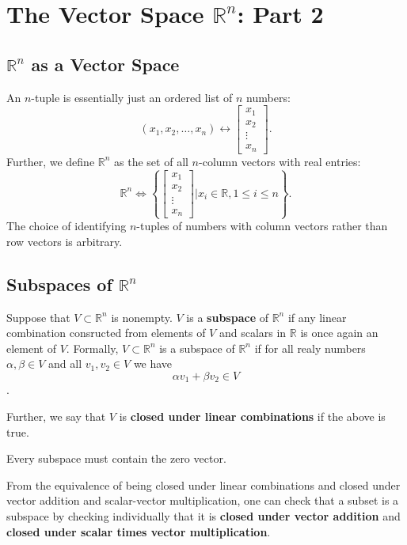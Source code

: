 \setcounter{chapter}{8}
\chapter{The Vector Space \(\mathbb{R}^n\): Part 2}
\section{\(\mathbb{R} ^n\) as a Vector Space}
An \(n\)-tuple is essentially just an ordered list of \(n\) numbers:
\[
	(x_1, x_2, \ldots , x_n) \leftrightarrow
	\begin{bmatrix}
		x_1 \\ x_2 \\ \vdots \\ x_n
	\end{bmatrix}.
\]
Further, we define \(\mathbb{R} ^n\) as the set of all \(n\)-column vectors with real entries:
\[
	\mathbb{R} ^n \iff \left\{ 
		\begin{bmatrix}
			x_1 \\ x_2 \\ \vdots \\ x_n
		\end{bmatrix}
		| x_i \in \mathbb{R}, 1 \leq i \leq n
	 \right\}.
\]
The choice of identifying \(n\)-tuples of numbers with column vectors rather than row vectors is arbitrary.

\section{Subspaces of \(\mathbb{R} ^n\)}

\begin{definition}[Subspace]
	Suppose that \(V \subset \mathbb{R} ^n\) is nonempty. \(V\) is a \textbf{subspace} of \(\mathbb{R} ^n\) if any linear combination consructed from elements of \(V\) and scalars in \(\mathbb{R} \) is once again an element of \(V\). Formally, \(V \subset \mathbb{R} ^n\) is a subspace of \(\mathbb{R} ^n\) if for all realy numbers \(\alpha, \beta \in V\) and all \(v_1, v_2 \in V\) we have
	\[
		\alpha v_1 + \beta  v_2 \in V
	\]. 
	\begin{remark}
		Further, we say that \(V\) is \textbf{closed under linear combinations} if the above is true.
	\end{remark}
	\begin{remark}
		  Every subspace must contain the zero vector.
	\end{remark}
\end{definition}
From the equivalence of being closed under linear combinations and closed under vector addition and scalar-vector multiplication, one can check that a subset is a subspace by checking individually that it is \textbf{closed under vector addition} and \textbf{closed under scalar times vector multiplication}.


